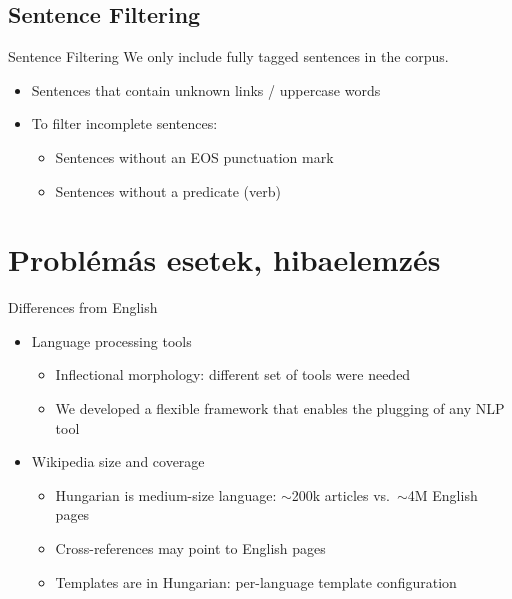 \documentclass[utf8x,t]{beamer}
\newcommand{\vitem}{\item \vspace{4pt}}
\newcommand{\nagytilde}{$\sim$}
\begin{document}
\subsection{Sentence Filtering}
\begin{frame}{Sentence Filtering}
  \bigskip
  We only include fully tagged sentences in the corpus.
  \smallskip
  \begin{itemize}
  \vitem Sentences that contain unknown links / uppercase words
  \vitem To filter incomplete sentences:
    \begin{itemize}
    \vitem Sentences without an EOS punctuation mark
    \vitem Sentences without a predicate (verb)
    \end{itemize}
  \end{itemize}
\end{frame}

\section{Problémás esetek, hibaelemzés}


\begin{frame}{Differences from English}
  \bigskip
  \begin{itemize}
  \vitem Language processing tools
    \begin{itemize}
    \vitem Inflectional morphology: different set of tools were needed 
    \vitem We developed a flexible framework that enables the plugging of any NLP tool
    \end{itemize}
  \vitem Wikipedia size and coverage
    \begin{itemize}
    \vitem Hungarian is medium-size language: \nagytilde 200k articles vs.~\nagytilde 4M English pages
    \vitem Cross-references may point to English pages
    \vitem Templates are in Hungarian: per-language template configuration
    \end{itemize}
  \end{itemize}
\end{frame}
\end{document}
